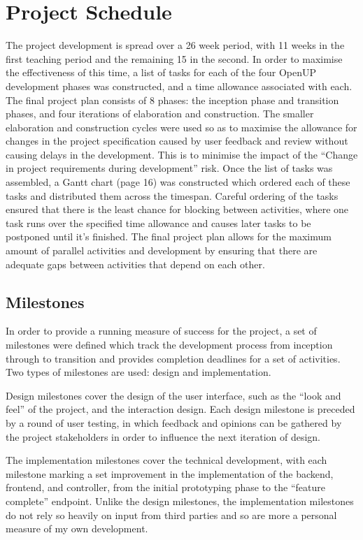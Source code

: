 \documentclass[12pt,a4paper]{article}
\begin{document}
\section{Project Schedule}
The project development is spread over a 26 week period, with 11 weeks in the
first teaching period and the remaining 15 in the second. In order to maximise
the effectiveness of this time, a list of tasks for each of the four OpenUP
development phases was constructed, and a time allowance associated with
each. The final project plan consists of 8 phases: the inception phase and
transition phases, and four iterations of elaboration and construction.  The
smaller elaboration and construction cycles were used so as to maximise the
allowance for changes in the project specification caused by user feedback and
review without causing delays in the development. This is to minimise the impact
of the ``Change in project requirements during development'' risk. Once the list
of tasks was assembled, a Gantt chart (page 16) was constructed which ordered
each of these tasks and distributed them across the timespan. Careful ordering
of the tasks ensured that there is the least chance for blocking between
activities, where one task runs over the specified time allowance and causes
later tasks to be postponed until it's finished.  The final project plan allows
for the maximum amount of parallel activities and development by ensuring that
there are adequate gaps between activities that depend on each other.

\subsection{Milestones}
In order to provide a running measure of success for the project, a set of
milestones were defined which track the development process from inception
through to transition and provides completion deadlines for a set of activities.
Two types of milestones are used: design and implementation.

Design milestones cover the design of the user interface, such as the ``look and
feel'' of the project, and the interaction design. Each design milestone is
preceded by a round of user testing, in which feedback and opinions can be
gathered by the project stakeholders in order to influence the next iteration of
design.

The implementation milestones cover the technical development, with each
milestone marking a set improvement in the implementation of the backend,
frontend, and controller, from the initial prototyping phase to the ``feature
complete'' endpoint. Unlike the design milestones, the implementation milestones
do not rely so heavily on input from third parties and so are more a personal
measure of my own development.
\end{document}

